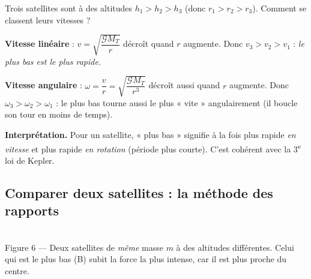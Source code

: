 \documentclass[11pt,a4paper]{article}
\newcommand{\vv}[1]{\vec{#1}}
\newcommand{\Grav}{\mathcal{G}}        %
\begin{document}
\begin{exemple}
Trois satellites sont à des altitudes $h_1>h_2>h_3$ (donc $r_1>r_2>r_3$). Comment se
classent leurs vitesses ?

\smallskip
\textbf{Vitesse linéaire} : $v=\sqrt{\dfrac{\Grav M_T}{r}}$ décroît quand $r$ augmente.
Donc $\boxed{v_3>v_2>v_1}$ : \emph{le plus bas est le plus rapide}.

\smallskip
\textbf{Vitesse angulaire} : $\omega=\dfrac{v}{r}=\sqrt{\dfrac{\Grav M_T}{r^3}}$ décroît
aussi quand $r$ augmente. Donc $\boxed{\omega_3>\omega_2>\omega_1}$ : le plus bas tourne
aussi le plus « vite » angulairement (il boucle son tour en moins de temps).

\smallskip
\textbf{Interprétation.} Pour un satellite, « plus bas » signifie à la fois plus rapide
\emph{en vitesse} et plus rapide \emph{en rotation} (période plus courte). C'est cohérent
avec la 3\textsuperscript{e} loi de Kepler.
\end{exemple}

\subsection{Comparer deux satellites : la méthode des rapports}

\begin{center}
\\[2pt]
{\footnotesize Figure 6 --- Deux satellites de \emph{même} masse $m$ à des altitudes
différentes. Celui qui est le plus bas (B) subit la force la plus intense, car il est
plus proche du centre.}
\end{center}
\end{document}
